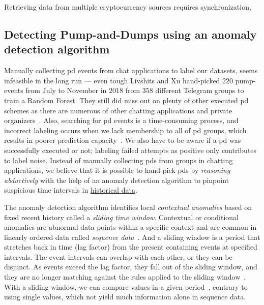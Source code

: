 

Retrieving data from multiple cryptocurrency sources requires synchronization, 







\subsection{Detecting Pump-and-Dumps using an anomaly detection algorithm}
Manually collecting \ac{pd} events from chat applications to label our datasets, seems infeasible in the long run — even tough Livshits and Xu \cite{P&D_anatomy} hand-picked $220$ pump-events from July to November in 2018 from $358$ different Telegram groups to train a Random Forest. They still did miss out on plenty of other executed \ac{pd} schemes as there are numerous of other chatting applications and private organizers~\cite{blockonomi}. Also, searching for \ac{pd} events is a time-consuming process, and incorrect labeling occurs when we lack membership to all of \ac{pd} groups, which results in poorer prediction capacity~\cite{label_noise}. We also have to be aware if a \ac{pd} was successfully executed or not; labeling failed attempts as positive only contributes to label noise. Instead of manually collecting \acp{pd} from groups in chatting applications, we believe that it is possible to hand-pick \acp{pd} by \emph{reasoning abductively} with the help of an anomaly detection algorithm to pinpoint suspicious time intervals in \underline{historical data}.

The anomaly detection algorithm identifies local \emph{contextual anomalies} based on fixed recent history called a \emph{sliding time window}. Contextual or conditional anomalies are abnormal data points within a specific context and are common in linearly ordered data called \emph{sequence data}~\cite{anomaly_survey}. And a sliding window is a period that stretches back in time (lag factor) from the present containing events at specified intervals. The event intervals can overlap with each other, or they can be disjunct. As events exceed the lag factor, they fall out of the sliding window, and they are no longer matching against the rules applied to the sliding window~\cite{redhat}. With a sliding window, we can compare values in a given period~\cite{P&D_to_the_moon}, contrary to using single values, which not yield much information alone in sequence data.

